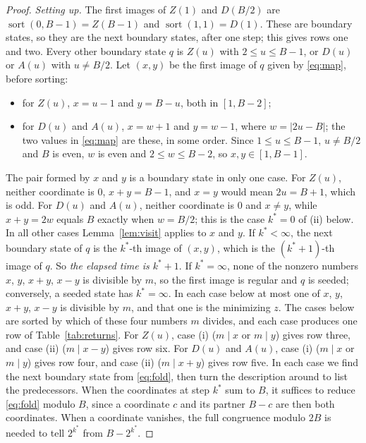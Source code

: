 \documentclass[11pt]{amsart}
\theoremstyle{definition}
\theoremstyle{remark}
\DeclareMathOperator{\sort}{sort}
\begin{document}
\begin{proof}
\emph{Setting up.} The first images of $Z(1)$ and $D(B/2)$ are $\sort(0,B-1)=Z(B-1)$ and $\sort(1,1)=D(1)$. These are boundary states, so they are the next boundary states, after one step; this gives rows one and two. Every other boundary state $q$ is $Z(u)$ with $2\le u\le B-1$, or $D(u)$ or $A(u)$ with $u\ne B/2$. Let $(x,y)$ be the first image of $q$ given by \eqref{eq:map}, before sorting:
\begin{itemize}
\item for $Z(u)$, $x=u-1$ and $y=B-u$, both in $[1,B-2]$;
\item for $D(u)$ and $A(u)$, $x=w+1$ and $y=w-1$, where $w=|2u-B|$; the two values in \eqref{eq:map} are these, in some order. Since $1\le u\le B-1$, $u\ne B/2$ and $B$ is even, $w$ is even and $2\le w\le B-2$, so $x,y\in[1,B-1]$.
\end{itemize}
The pair formed by $x$ and $y$ is a boundary state in only one case. For $Z(u)$, neither coordinate is $0$, $x+y=B-1$, and $x=y$ would mean $2u=B+1$, which is odd. For $D(u)$ and $A(u)$, neither coordinate is $0$ and $x\ne y$, while $x+y=2w$ equals $B$ exactly when $w=B/2$; this is the case $k^*=0$ of (ii) below. In all other cases Lemma~\ref{lem:visit} applies to $x$ and $y$. If $k^*<\infty$, the next boundary state of $q$ is the $k^*$-th image of $(x,y)$, which is the $(k^*+1)$-th image of $q$. So \emph{the elapsed time is $k^*+1$}. If $k^*=\infty$, none of the nonzero numbers $x$, $y$, $x+y$, $x-y$ is divisible by $m$, so the first image is regular and $q$ is seeded; conversely, a seeded state has $k^*=\infty$. In each case below at most one of $x$, $y$, $x+y$, $x-y$ is divisible by $m$, and that one is the minimizing $z$. The cases below are sorted by which of these four numbers $m$ divides, and each case produces one row of Table~\ref{tab:returns}. For $Z(u)$, case (i) ($m\mid x$ or $m\mid y$) gives row three, and case (ii) ($m\mid x-y$) gives row six. For $D(u)$ and $A(u)$, case (i) ($m\mid x$ or $m\mid y$) gives row four, and case (ii) ($m\mid x+y$) gives row five. In each case we find the next boundary state from \eqref{eq:fold}, then turn the description around to list the predecessors. When the coordinates at step $k^*$ sum to $B$, it suffices to reduce \eqref{eq:fold} modulo $B$, since a coordinate $c$ and its partner $B-c$ are then both coordinates. When a coordinate vanishes, the full congruence modulo $2B$ is needed to tell $2^{k^*}$ from $B-2^{k^*}$.


\end{proof}
\end{document}
